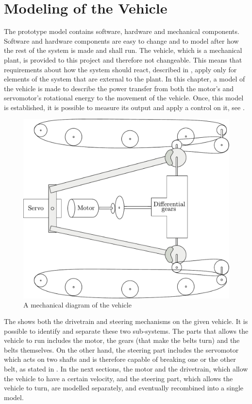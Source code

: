 \chapter{Modeling of the Vehicle}\label{cha:ModelOfVehicle}

The prototype model contains software, hardware and mechanical components. Software and hardware components are easy to change and to model after how the rest of the system is made and shall run. The vehicle, which is a mechanical plant, is provided to this project and therefore not changeable. This means that requirements about how the system should react, described in , apply only for elements of the system that are external to the plant. In this chapter, a model of the vehicle is made to describe the power transfer from both the motor's and servomotor's rotational energy to the movement of the vehicle. Once, this model is established, it is possible to measure its output and apply a control on it, see .


\begin{figure}[H]
	\centering
	\includegraphics[width=\textwidth]{figures/completeMechanical.pdf}
	\caption{A mechanical diagram of the vehicle}
	\label{fig:completeMechanicalDiagram}
\end{figure}

The  shows both the drivetrain and steering mechanisms on the given vehicle. It is possible to identify and separate these two sub-systems. The parts that allows the vehicle to run includes the motor, the gears (that make the belts turn) and the belts themselves. On the other hand, the steering part includes the servomotor which acts on two shafts and is therefore capable of breaking one or the other belt, as stated in . In the next sections, the motor and the drivetrain, which allow the vehicle to have a certain velocity, and the steering part, which allows the vehicle to turn, are modelled separately, and eventually recombined into a single model.